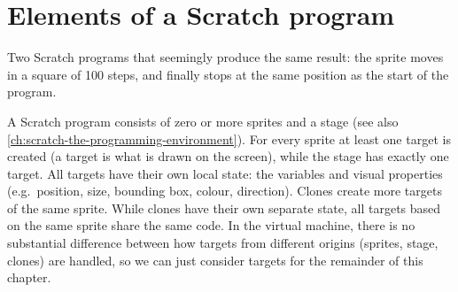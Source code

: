 \documentclass[../main]{subfiles}
\begin{document}
\section{Elements of a Scratch program}\label{sec:elements-of-a-scratch-program}

\begin{listing}
    \centering
    \begin{sublisting}{0.45\textwidth}
        \centering
        \begin{scratch}[scale=0.7]
        \end{scratch}
    \end{sublisting}
    \begin{sublisting}{0.45\textwidth}
        \centering
        \begin{scratch}[scale=0.7]
        \end{scratch}
    \end{sublisting}
    \caption{
        Two Scratch programs that seemingly produce the same result: the sprite moves in a square of 100 steps, and finally stops at the same position as the start of the program.
    }
    \label{lst:scratch-two-programs}
\end{listing}

A Scratch program consists of zero or more sprites and a stage (see also \cref{ch:scratch-the-programming-environment}).
For every sprite at least one target is created (a target is what is drawn on the screen), while the stage has exactly one target.
All targets have their own local state: the variables and visual properties (e.g.\ position, size, bounding box, colour, direction).
Clones create more targets of the same sprite.
While clones have their own separate state, all targets based on the same sprite share the same code.
In the virtual machine, there is no substantial difference between how targets from different origins (sprites, stage, clones) are handled, so we can just consider targets for the remainder of this chapter.
\end{document}
